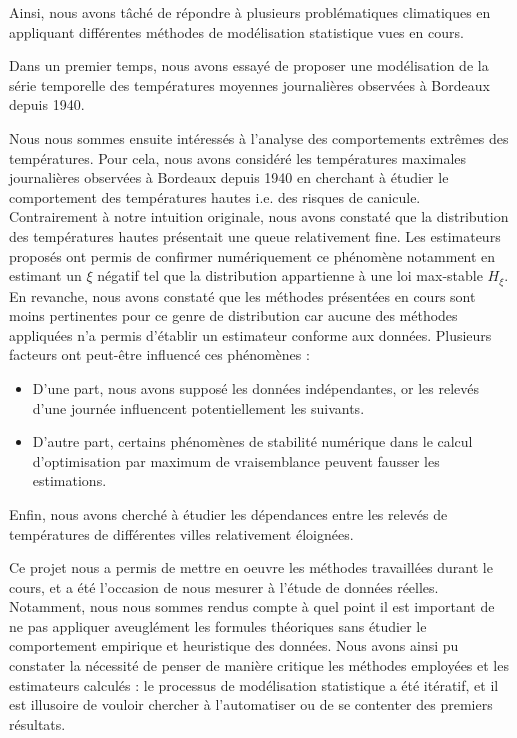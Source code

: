 \documentclass[../report.tex]{subfiles}
\begin{document}
\par Ainsi, nous avons tâché de répondre à plusieurs problématiques climatiques en appliquant différentes méthodes de modélisation statistique vues en cours.

\vspace{5mm}
\par Dans un premier temps, nous avons essayé de proposer une modélisation de la série temporelle des températures moyennes journalières observées à Bordeaux depuis 1940.

\vspace{5mm}
\par Nous nous sommes ensuite intéressés à l'analyse des comportements extrêmes des températures. Pour cela, nous avons considéré les températures maximales journalières observées à Bordeaux depuis 1940 en cherchant à étudier le comportement des températures hautes i.e. des risques de canicule. Contrairement à notre intuition originale, nous avons constaté que la distribution des températures hautes présentait une queue relativement fine. Les estimateurs proposés ont permis de confirmer numériquement ce phénomène notamment en estimant un $\xi$ négatif tel que la distribution appartienne à une loi max-stable $H_{\xi}$. En revanche, nous avons constaté que les méthodes présentées en cours sont moins pertinentes pour ce genre de distribution car aucune des méthodes appliquées n'a permis d'établir un estimateur conforme aux données. Plusieurs facteurs ont peut-être influencé ces phénomènes : 
\begin{itemize}
\item D'une part, nous avons supposé les données indépendantes, or les relevés d'une journée influencent potentiellement les suivants.
\item D'autre part, certains phénomènes de stabilité numérique dans le calcul d'optimisation par maximum de vraisemblance peuvent fausser les estimations.
\end{itemize}

\vspace{5mm}
\par Enfin, nous avons cherché à étudier les dépendances entre les relevés de températures de différentes villes relativement éloignées.

\vspace{7mm}
\par Ce projet nous a permis de mettre en oeuvre les méthodes travaillées durant le cours, et a été l'occasion de nous mesurer à l'étude de données réelles. Notamment, nous nous sommes rendus compte à quel point il est important de ne pas appliquer aveuglément les formules théoriques sans étudier le comportement empirique et heuristique des données. Nous avons ainsi pu constater la nécessité de penser de manière critique les méthodes employées et les estimateurs calculés : le processus de modélisation statistique a été itératif, et il est illusoire de vouloir chercher à l'automatiser ou de se contenter des premiers résultats.
\end{document}

